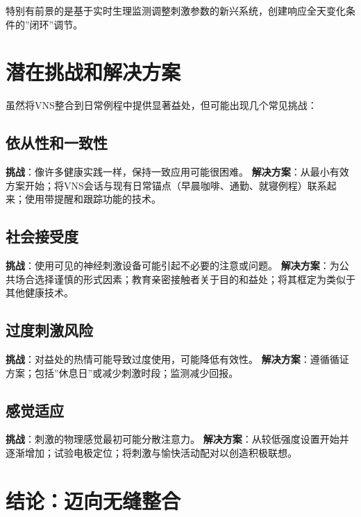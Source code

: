 \documentclass[
  Letterpaper,
]{scrbook}
\begin{document}
特别有前景的是基于实时生理监测调整刺激参数的新兴系统，创建响应全天变化条件的''闭环''调节。

\section{潜在挑战和解决方案}\label{ux6f5cux5728ux6311ux6218ux548cux89e3ux51b3ux65b9ux6848}

虽然将VNS整合到日常例程中提供显著益处，但可能出现几个常见挑战：

\subsection{依从性和一致性}\label{ux4f9dux4eceux6027ux548cux4e00ux81f4ux6027}

\textbf{挑战}：像许多健康实践一样，保持一致应用可能很困难。
\textbf{解决方案}：从最小有效方案开始；将VNS会话与现有日常锚点（早晨咖啡、通勤、就寝例程）联系起来；使用带提醒和跟踪功能的技术。

\subsection{社会接受度}\label{ux793eux4f1aux63a5ux53d7ux5ea6}

\textbf{挑战}：使用可见的神经刺激设备可能引起不必要的注意或问题。
\textbf{解决方案}：为公共场合选择谨慎的形式因素；教育亲密接触者关于目的和益处；将其框定为类似于其他健康技术。

\subsection{过度刺激风险}\label{ux8fc7ux5ea6ux523aux6fc0ux98ceux9669}

\textbf{挑战}：对益处的热情可能导致过度使用，可能降低有效性。
\textbf{解决方案}：遵循循证方案；包括''休息日''或减少刺激时段；监测减少回报。

\subsection{感觉适应}\label{ux611fux89c9ux9002ux5e94}

\textbf{挑战}：刺激的物理感觉最初可能分散注意力。
\textbf{解决方案}：从较低强度设置开始并逐渐增加；试验电极定位；将刺激与愉快活动配对以创造积极联想。

\section{结论：迈向无缝整合}\label{ux7ed3ux8bbaux8fc8ux5411ux65e0ux7f1dux6574ux5408}
\end{document}
